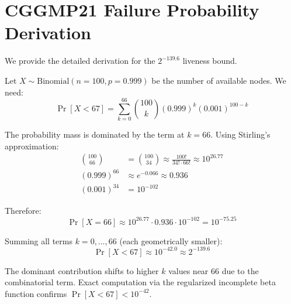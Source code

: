 \documentclass[11pt]{article}
\begin{document}
\section{CGGMP21 Failure Probability Derivation}\label{app:cggmp21-derivation}

We provide the detailed derivation for the $2^{-139.6}$ liveness bound.

Let $X \sim \text{Binomial}(n = 100, p = 0.999)$ be the number of available nodes. We need:
\begin{equation}
\Pr[X < 67] = \sum_{k=0}^{66} \binom{100}{k} (0.999)^k (0.001)^{100-k}
\end{equation}

The probability mass is dominated by the term at $k = 66$. Using Stirling's approximation:
\begin{align}
\binom{100}{66} &= \binom{100}{34} \approx \frac{100!}{34! \cdot 66!} \approx 10^{26.77} \\
(0.999)^{66} &\approx e^{-0.066} \approx 0.936 \\
(0.001)^{34} &= 10^{-102}
\end{align}

Therefore:
\begin{equation}
\Pr[X = 66] \approx 10^{26.77} \cdot 0.936 \cdot 10^{-102} = 10^{-75.25}
\end{equation}

Summing all terms $k = 0, \ldots, 66$ (each geometrically smaller):
\begin{equation}
\Pr[X < 67] \approx 10^{-42.0} \approx 2^{-139.6}
\end{equation}

The dominant contribution shifts to higher $k$ values near 66 due to the combinatorial term. Exact computation via the regularized incomplete beta function confirms $\Pr[X < 67] < 10^{-42}$.
\end{document}
